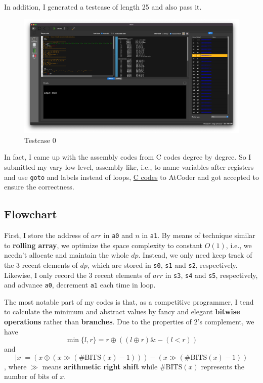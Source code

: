 \documentclass[12pt, a4paper]{article}
\begin{document}
In addition, I generated a testcase of length 25 and also pass it.

\begin{figure}[htbp]
\centering
\includegraphics[width=\linewidth]{tc0}
\caption{Testcase 0}
\label{fig:tc0}
\end{figure}

In fact, I came up with the assembly codes from C codes degree by degree. So I submitted my vary low-level, assembly-like, i.e., to name variables after registers and use \texttt{goto} and labels instead of loops, \href{https://atcoder.jp/contests/dp/submissions/41496401}{C codes} to AtCoder and got accepted to ensure the correctness.

\subsection{Flowchart}

First, I store the address of $arr$ in \texttt{a0} and $n$ in \texttt{a1}. By means of technique similar to \textbf{rolling array}, we optimize the space complexity to constant $O(1)$, i.e., we needn't allocate and maintain the whole $dp$. Instead, we only need keep track of the 3 recent elements of $dp$, which are stored in \texttt{s0}, \texttt{s1} and \texttt{s2}, respectively. Likewise, I only record the 3 recent elements of $arr$ in \texttt{s3}, \texttt{s4} and \texttt{s5}, respectively, and advance \texttt{a0}, decrement \texttt{a1} each time in loop.

The most notable part of my codes is that, as a competitive programmer, I tend to calculate the minimum and abstract values by fancy and elegant \textbf{bitwise operations} rather than \textbf{branches}. Due to the properties of 2's complement, we have $$\min\{l,r\}=r\oplus((l\oplus r)\&-(l<r))$$ and $$|x|=(x\oplus(x\gg(\#\text{BITS}(x)-1)))-(x\gg(\#\text{BITS}(x)-1))$$, where $\gg$ means \textbf{arithmetic right shift} while $\#\text{BITS}(x)$ represents the number of bits of $x$.
\end{document}
